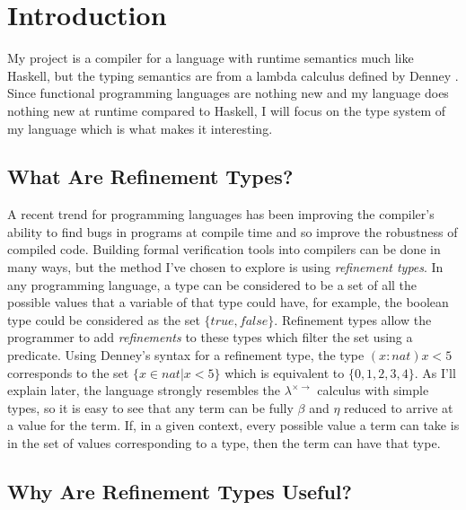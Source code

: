 \section{Introduction}

My project is a compiler for a language with runtime semantics much like Haskell,
but the typing semantics are from a lambda calculus defined by Denney \cite{denney98}.
Since functional programming languages are nothing new and my language does nothing new
at runtime compared to Haskell, I will focus on the type system of my language which is
what makes it interesting.

\subsection{What Are Refinement Types?}

A recent trend for programming languages has been improving the compiler's ability to find
bugs in programs at compile time and so improve the robustness of compiled code.
Building formal verification tools into compilers can be done in many ways, but the method
I've chosen to explore is using \textit{refinement types}.
In any programming language, a type can be considered to be a set of all the possible values
that a variable of that type could have, for example, the boolean type could be considered
as the set $\{true, false\}$.
Refinement types allow the programmer to add \textit{refinements} to these types which
filter the set using a predicate.
Using Denney's syntax for a refinement type, the type
$(x:nat)x<5$ corresponds to the set $\{x \in nat | x < 5\}$ which is equivalent to
$\{0, 1, 2, 3, 4\}$.
As I'll explain later, the language strongly resembles the $\lambda^{\times \rightarrow}$ calculus
with simple types, so it is easy to see that any term can be fully $\beta$ and $\eta$ reduced to
arrive at a value for the term.
If, in a given context, every possible value a term can take is in the set of values corresponding to
a type, then the term can have that type.

\subsection{Why Are Refinement Types Useful?}

